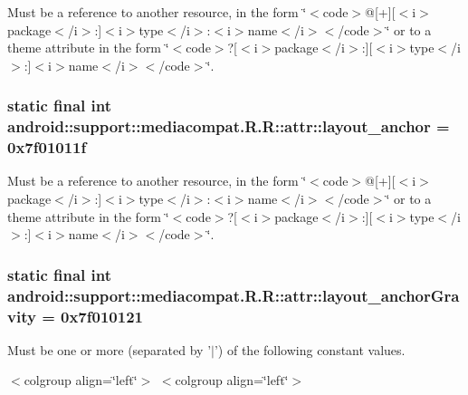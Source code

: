 Must be a reference to another resource, in the form \char`\"{}$<$code$>$@\mbox{[}+\mbox{]}\mbox{[}$<$i$>$package$<$/i$>$:\mbox{]}$<$i$>$type$<$/i$>$:$<$i$>$name$<$/i$>$$<$/code$>$\char`\"{} or to a theme attribute in the form \char`\"{}$<$code$>$?\mbox{[}$<$i$>$package$<$/i$>$:\mbox{]}\mbox{[}$<$i$>$type$<$/i$>$:\mbox{]}$<$i$>$name$<$/i$>$$<$/code$>$\char`\"{}. \hypertarget{classandroid_1_1support_1_1mediacompat_1_1_r_1_1attr_ef3ae9b882e6dc44adc34deda02d8d3d}{
\subsubsection[{layout\_\-anchor}]{\setlength{\rightskip}{0pt plus 5cm}static final int android::support::mediacompat.R.R::attr::layout\_\-anchor = 0x7f01011f}}
\label{classandroid_1_1support_1_1mediacompat_1_1_r_1_1attr_ef3ae9b882e6dc44adc34deda02d8d3d}


Must be a reference to another resource, in the form \char`\"{}$<$code$>$@\mbox{[}+\mbox{]}\mbox{[}$<$i$>$package$<$/i$>$:\mbox{]}$<$i$>$type$<$/i$>$:$<$i$>$name$<$/i$>$$<$/code$>$\char`\"{} or to a theme attribute in the form \char`\"{}$<$code$>$?\mbox{[}$<$i$>$package$<$/i$>$:\mbox{]}\mbox{[}$<$i$>$type$<$/i$>$:\mbox{]}$<$i$>$name$<$/i$>$$<$/code$>$\char`\"{}. \hypertarget{classandroid_1_1support_1_1mediacompat_1_1_r_1_1attr_961e0440439f856f1539cbd62e654dc9}{
\subsubsection[{layout\_\-anchorGravity}]{\setlength{\rightskip}{0pt plus 5cm}static final int android::support::mediacompat.R.R::attr::layout\_\-anchorGravity = 0x7f010121}}
\label{classandroid_1_1support_1_1mediacompat_1_1_r_1_1attr_961e0440439f856f1539cbd62e654dc9}


Must be one or more (separated by '$|$') of the following constant values. \begin{TabularC}{0}
\hline
\end{TabularC}
$<$colgroup align=\char`\"{}left\char`\"{}$>$ $<$colgroup align=\char`\"{}left\char`\"{}$>$ 

